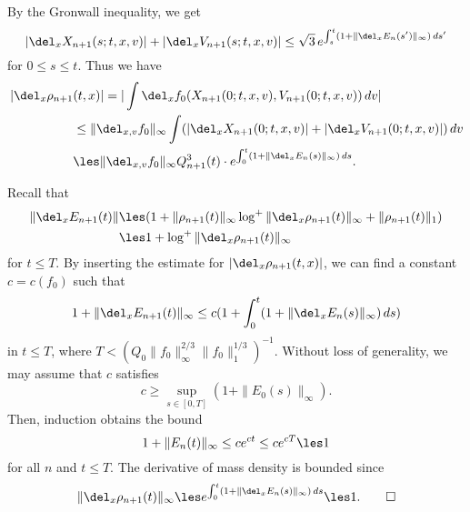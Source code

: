 \documentclass[11pt]{amsart}
\begin{document}
\begin{pf}
By the Gronwall inequality, we get
\[|\del_xX_{n+1}(s;t,x,v)|+|\del_xV_{n+1}(s;t,x,v)|\le\sqrt3\,e^{\int_s^t(1+\|\del_xE_n(s')\|_\infty)\,ds'}\]
for $0\le s\le t$.
Thus we have
\begin{align*}
|\del_x\rho_{n+1}&(t,x)|
=|\int\del_xf_0(X_{n+1}(0;t,x,v),V_{n+1}(0;t,x,v))\,dv|\\
&\le\|\del_{x,v}f_0\|_\infty\int(|\del_xX_{n+1}(0;t,x,v)|+|\del_xV_{n+1}(0;t,x,v)|)\,dv\\
&\les\|\del_{x,v}f_0\|_\infty Q_{n+1}^3(t)\cdot e^{\int_0^t(1+\|\del_xE_n(s)\|_\infty)\,ds}.
\end{align*}

Recall that
\begin{align*}
\|\del_xE_{n+1}(t)\|
&\les(1+\|\rho_{n+1}(t)\|_\infty\log^+\|\del_x\rho_{n+1}(t)\|_\infty+\|\rho_{n+1}(t)\|_1)\\
&\les1+\log^+\|\del_x\rho_{n+1}(t)\|_\infty
\end{align*}
for $t\le T$.
By inserting the estimate for $|\del_x\rho_{n+1}(t,x)|$, we can find a constant $c=c(f_0)$ such that
\begin{align*}
1+\|\del_xE_{n+1}(t)\|_\infty\le c(1+\int_0^t(1+\|\del_xE_n(s)\|_\infty)\,ds)
\end{align*}
in $t\le T$, where $T<(Q_0\|f_0\|_\infty^{2/3}\|f_0\|_1^{1/3})^{-1}$.
Without loss of generality, we may assume that $c$ satisfies
\[c\ge\sup_{s\in[0,T]}(1+\|E_0(s)\|_\infty).\]
Then, induction obtains the bound
\[1+\|E_n(t)\|_\infty\le ce^{ct}\le ce^{cT}\les1\]
for all $n$ and $t\le T$.
The derivative of mass density is bounded since
\[\|\del_x\rho_{n+1}(t)\|_\infty\les e^{\int_0^t(1+\|\del_xE_n(s)\|_\infty)\,ds}\les1.\qedhere\]
\end{pf}
\end{document}
